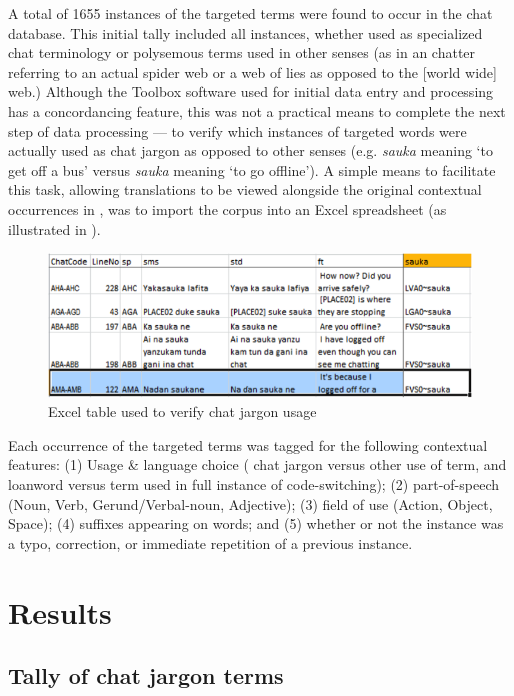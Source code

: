 \documentclass[output=paper,newtxmath,modfonts,nonflat,hidelinks]{langsci/langscibook}
\begin{document}
A total of 1655 instances of the targeted terms were found to occur in the  chat database. This initial tally included all instances, whether used as specialized chat terminology or polysemous terms used in other senses (as in an  chatter referring to an actual spider web or a web of lies as opposed to the [world wide] web.) Although the Toolbox software used for initial data entry and processing has a concordancing feature, this was not a practical means to complete the next step of data processing — to verify which instances of targeted words were actually used as chat jargon as opposed to other senses (e.g. \textit{sauka} meaning ‘to get off a bus’ versus \textit{sauka} meaning ‘to go offline’). A simple means to facilitate this task, allowing  translations to be viewed alongside the original contextual occurrences in , was to import the corpus into an Excel spreadsheet (as illustrated in ).

  

\begin{figure}
\includegraphics[width=\textwidth]{figures/purvis-fig2.png}
\caption{Excel table used to verify chat jargon usage}
\label{fig:purvis:2}
\end{figure} 

Each occurrence of the targeted terms was tagged for the following contextual features: (1) Usage \& language choice ( chat jargon versus other use of  term, and  loanword versus  term used in full instance of code-switching); (2) part-of-speech (Noun, Verb, Gerund/Verbal-noun, Adjective); (3) field of use (Action, Object, Space); (4)  suffixes appearing on words; and (5) whether or not the instance was a typo, correction, or immediate repetition of a previous instance. 

\section{Results}\label{sec:purvis:4}
\subsection{Tally of chat jargon terms}
\end{document}

